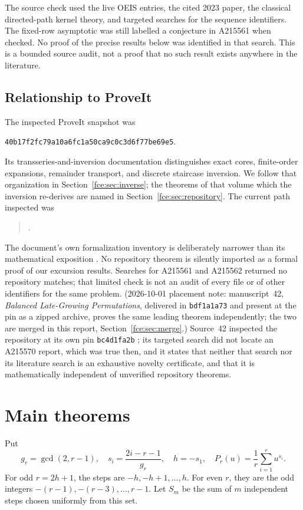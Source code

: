 \documentclass[11pt,a4paper]{article}
\numberwithin{equation}{section}
\theoremstyle{definition}\newtheorem{definition}[theorem]{Definition}
\theoremstyle{remark}\newtheorem{remark}[theorem]{Remark}
\begin{document}
The source check used the live OEIS entries, the cited 2023 paper, the
classical directed-path kernel theory, and targeted searches for the
sequence identifiers. The fixed-row asymptotic was still labelled a
conjecture in A215561 when checked. No proof of the precise results below
was identified in that search. This is a bounded source audit, not a
proof that no such result exists anywhere in the literature.

\subsection{Relationship to ProveIt}\label{fce:sec:proveit}
The inspected ProveIt snapshot was
\begin{center}\small\texttt{40b17f2fc79a10a6fc1a50ca9c0c3d6f77be69e5}.\end{center}
Its transseries-and-inversion documentation distinguishes exact cores,
finite-order expansions, remainder transport, and discrete staircase
inversion. We follow that organization in Section~\ref{fce:sec:inverse};
the theorems of that volume which the inversion re-derives are named in
Section~\ref{fce:sec:repository}.
The current path inspected was
\begin{quote}\small{}.
\end{quote}
The document's own formalization inventory is deliberately narrower than
its mathematical exposition \cite{proveit}. No repository theorem is
silently imported as a formal proof of our excursion results. Searches
for A215561 and A215562 returned no repository matches; that limited check
is not an audit of every file or of other identifiers for the same problem.
(2026-10-01 placement note: manuscript~42, \emph{Balanced Late-Growing
Permutations}, delivered in \texttt{bdf1a1a73} and present at the pin as a
zipped archive, proves the same leading theorem independently; the two are
merged in this report, Section~\ref{fce:sec:merge}.) Source~42 inspected
the repository at its own pin \texttt{bc4d1fa2b} \cite{proveit42}; its
targeted search did not locate an A215570 report, which was true then, and
it states that neither that search nor its literature search is an
exhaustive novelty certificate, and that it is mathematically independent
of unverified repository theorems.

\section{Main theorems}
Put
\begin{equation}\label{fce:eq:steps}
 g_r=\gcd(2,r-1),\quad
 s_i=\frac{2i-r-1}{g_r},\quad
 h=-s_1,\quad
 P_r(u)=\frac1r\sum_{i=1}^r u^{s_i}.
\end{equation}
For odd $r=2h+1$, the steps are $-h,-h+1,\ldots,h$. For even $r$, they
are the odd integers $-(r-1),-(r-3),\ldots,r-1$. Let $S_m$ be the sum of
$m$ independent steps chosen uniformly from this set.
\end{document}
